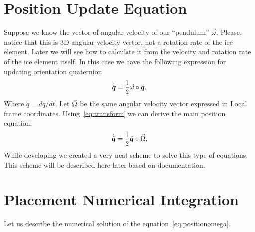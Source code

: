 
\section{Position Update Equation}

Suppose we know the vector of angular velocity of our ``pendulum''
$\vec{\omega}$. Please, notice that this is 3D angular velocity
vector, not a rotation rate of the ice element. Later we will see how
to calculate it from the velocity and rotation rate of the ice element
itself. In this case we have the following expression for updating
orientation quaternion
\begin{equation}
  \dot{{\hat{\bm{q}}}} = \frac{1}{2}{\vec{\omega}}\circ{\hat{\bm{q}}}.
\end{equation}
Where $\dot q=dq/dt$.  Let ${\vec{\Omega}}$ be the same angular velocity
vector expressed in Local frame
coordinates. Using~\eqref{eq:transform} we can derive the main
position equation:
\begin{equation}\label{eq:positionomega}
  \dot{{\hat{\bm{q}}}} = \frac{1}{2}{\hat{\bm{q}}}\circ{\vec{\Omega}},
\end{equation}
While developing \coupi\/ we created a very neat scheme to solve this
type of equations. This scheme will be described here later based on
\coupi\/ documentation.


\section{Placement Numerical Integration}

Let us describe the numerical solution of the
equation~\eqref{eq:positionomega}.  

